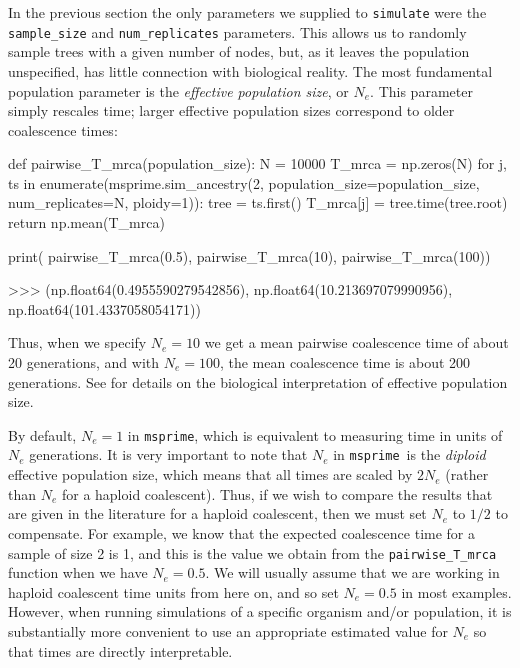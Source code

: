 \documentclass[graybox]{svmult}
\newcommand{\msprime}[0]{\texttt{msprime}}
\begin{document}
In the previous section the only parameters we supplied to
\texttt{simulate} were the \texttt{sample\_size} and
\texttt{num\_replicates} parameters. This allows us to randomly sample
trees with a given number of nodes, but, as it leaves the population
unspecified, has little connection with
biological reality. The most fundamental population parameter is the \emph{effective population size}, or
\(N_e\). This parameter simply rescales time; larger effective
population sizes correspond to older coalescence times:

\begin{pythoncode}
def pairwise_T_mrca(population_size):
    N = 10000
    T_mrca = np.zeros(N)
    for j, ts in enumerate(msprime.sim_ancestry(2, population_size=population_size, num_replicates=N, ploidy=1)):
        tree = ts.first()
        T_mrca[j] = tree.time(tree.root)
    return np.mean(T_mrca)

print(
    pairwise_T_mrca(0.5), pairwise_T_mrca(10),
    pairwise_T_mrca(100))

>>> (np.float64(0.4955590279542856),
     np.float64(10.213697079990956),
     np.float64(101.4337058054171))

\end{pythoncode}

    Thus, when we specify \(N_e=10\) we get a mean pairwise coalescence time of about
20 generations, and with \(N_e=100\), the mean coalescence time is about
200 generations. See \cite{wakely2008coalescent} for details on the biological interpretation of effective population size.

By default, \(N_e = 1\) in \msprime, which is equivalent to measuring
time in units of \(N_e\) generations. It is very important to note that
\(N_e\) in \msprime\ is the \emph{diploid} effective population size,
which means that all times are scaled by \(2N_e\) (rather than $N_e$ for a
haploid coalescent). Thus, if we wish to compare the results that are
given in the literature for a haploid coalescent, then we must set
\(N_e\) to $1/2$ to compensate. For example, we know that the expected
coalescence time for a sample of size 2 is 1, and this is the value we
obtain from the \texttt{pairwise\_T\_mrca} function when we have
\(N_e=0.5\). We will usually assume that we are working in haploid
coalescent time units from here on, and so set \(N_e=0.5\) in most
examples. However, when running simulations of a specific organism and/or population, it
is substantially more convenient to use an appropriate estimated value
for \(N_e\) so that times are directly interpretable.
\end{document}
